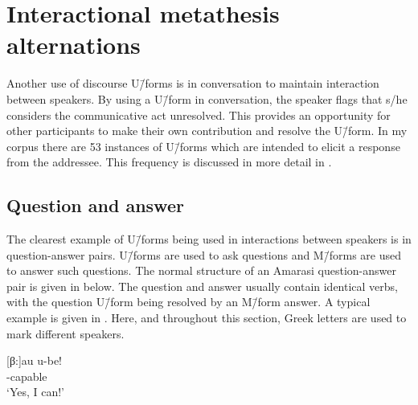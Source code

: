 \section{Interactional metathesis alternations}\label{sec:IntUnm}
Another use of discourse U\=/forms is in conversation
to maintain interaction between speakers.
By using a U\=/form in conversation, the speaker flags
that s/he considers the communicative act unresolved.
This provides an opportunity for other participants
to make their own contribution and resolve the U\=/form.
In my corpus there are 53 instances of U\=/forms
which are intended to elicit a response from the addressee.
This frequency is discussed in more detail in .

\subsection{Question and answer}\label{sec:Q/A}
The clearest example of U\=/forms being used in
interactions between speakers is in question-answer pairs.
U\=/forms are used to ask questions and M\=/forms
are used to answer such questions.
The normal structure of an Amarasi question-answer pair is given in  below.
The question and answer usually contain identical verbs,
with the question U\=/form being resolved by an M\=/form answer.
A typical example is given in .
Here, and throughout this section, Greek letters
are used to mark different speakers.

\begin{exe}
	\label{ex:Q/A}
\end{exe}

\begin{multicols}{2}
	\begin{exe}
		\label{ex:02/08/13, p.20}
			\begin{xlist}
			\end{xlist}
		\sn{ \txrf{observation 02/08/13, p.20}}
			\begin{xlist}
				[β:]{\gll	au u-be\tbr{iʔ}!\\
									{\au} \qu-capable{\tbrM}\\
						\glt	`Yes, I can!'}
			\end{xlist}
	\end{exe}
\end{multicols}

